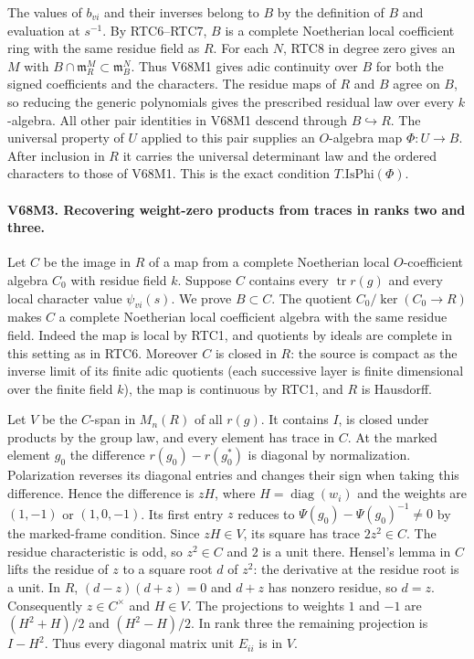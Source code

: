 The values of $b_{vi}$ and their inverses belong to $B$ by the
definition of $B$ and evaluation at $s^{-1}$. By RTC6--RTC7, $B$
is a complete Noetherian local coefficient ring with the same residue
field as $R$. For each $N$, RTC8 in degree zero gives an $M$ with
$B\cap\mathfrak m_R^M\subset\mathfrak m_B^N$. Thus V68M1 gives
adic continuity over $B$ for both the signed coefficients and the
characters. The residue maps of $R$ and $B$ agree on $B$, so reducing
the generic polynomials gives the prescribed residual law over every
$k$-algebra. All other pair identities in V68M1 descend through
$B\hookrightarrow R$. The universal property of $U$ applied to this
pair supplies an $O$-algebra map $\Phi:U\to B$. After inclusion in $R$
it carries the universal determinant law and the ordered characters
to those of V68M1. This is the exact condition $T.\mathrm{IsPhi}(\Phi)$.

\paragraph{V68M3. Recovering weight-zero products from traces in ranks two and three.}
Let $C$ be the image in $R$ of a map from a complete Noetherian local
$O$-coefficient algebra $C_0$ with residue field $k$. Suppose $C$
contains every $\operatorname{tr} r(g)$ and every local character
value $\psi_{vi}(s)$. We prove $B\subset C$. The quotient
$C_0/\ker(C_0\to R)$ makes $C$ a complete Noetherian local coefficient
algebra with the same residue field. Indeed the map is local by RTC1,
and quotients by ideals are complete in this setting as in RTC6.
Moreover $C$ is closed in $R$: the source is compact as the inverse
limit of its finite adic quotients (each successive layer is finite
dimensional over the finite field $k$), the map is continuous by RTC1,
and $R$ is Hausdorff.

Let $V$ be the $C$-span in $M_n(R)$ of all $r(g)$. It contains $I$,
is closed under products by the group law, and every element has trace
in $C$. At the marked element $g_0$ the difference
$r(g_0)-r(g_0^*)$ is diagonal by normalization. Polarization reverses
its diagonal entries and changes their sign when taking this
difference. Hence the difference is $zH$, where $H=\operatorname{diag}(w_i)$
and the weights are $(1,-1)$ or $(1,0,-1)$. Its first entry $z$ reduces
to $\Psi(g_0)-\Psi(g_0)^{-1}\ne0$ by the marked-frame condition.
Since $zH\in V$, its square has trace $2z^2\in C$. The residue
characteristic is odd, so $z^2\in C$ and $2$ is a unit there.
Hensel's lemma in $C$ lifts the residue of $z$ to a square root $d$
of $z^2$: the derivative at the residue root is a unit. In $R$,
$(d-z)(d+z)=0$ and $d+z$ has nonzero residue, so $d=z$. Consequently
$z\in C^\times$ and $H\in V$. The projections to weights $1$ and
$-1$ are $(H^2+H)/2$ and $(H^2-H)/2$. In rank three the remaining
projection is $I-H^2$. Thus every diagonal matrix unit $E_{ii}$ is in $V$.

